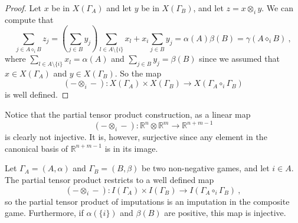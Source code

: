 \documentclass[a4paper,12pt]{amsart}
\begin{document}
\begin{proof}
Let $x$ be in $X(\Gamma_A)$ and let $y$ be in $X(\Gamma_B)$, and let $z = x \otimes_i y$. We can compute that 
\[
\sum_{j \in A \diamond_i B} z_j = \left(\sum_{j \in B} y_j \right) \sum_{l \in A \setminus \{i\}} x_l + x_i \sum_{j \in B} y_j = \alpha(A)\beta(B) = \gamma(A \diamond_i B)~, 
\]
where $\sum_{l \in A\setminus \{i\}} x_l = \alpha(A)$ and $\sum_{j \in B} y_j = \beta(B)$ since we assumed that \(x \in X(\Gamma_A)\) and \(y \in X(\Gamma_B)\). So the map 
\[
(- \otimes_i -): X(\Gamma_A) \times X(\Gamma_B) \longrightarrow X(\Gamma_A \circ_i \Gamma_B)
\]
is well defined.
\end{proof}

\begin{remark}
    Notice that the partial tensor product construction, as a linear map 
    \[
    (- \otimes_i -): \mathbb{R}^{n} \otimes \mathbb{R}^{m} \longrightarrow \mathbb{R}^{n+m-1}
    \]
    is clearly not injective. It is, however, surjective since any element in the canonical basis of $\mathbb{R}^{n+m-1}$ is in its image. 
\end{remark}

\begin{proposition}\label{prop: tenseur i des imputations}
    Let \(\Gamma_A = (A, \alpha)\) and \(\Gamma_B = (B, \beta)\) be two non-negative games, and let \(i \in A\). The partial tensor product restricts to a well defined map
    \[
    (- \otimes_i -): I(\Gamma_A) \times I(\Gamma_B) \longrightarrow I(\Gamma_A \circ_i \Gamma_B)~, 
    \]
    so the partial tensor product of imputations is an imputation in the composite game. Furthermore, if $\alpha(\{i\})$ and  $\beta(B)$ are positive, this map is injective. 
\end{proposition}
\end{document}
